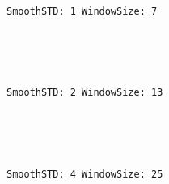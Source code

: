 \documentclass[11pt]{article}
\begin{document}
    \begin{center}
    \end{center}
    { \hspace*{\fill} \\}
    
    \begin{Verbatim}[commandchars=\\\{\}]
SmoothSTD: 1 WindowSize: 7
    \end{Verbatim}

    \begin{center}
    \end{center}
    { \hspace*{\fill} \\}
    
    \begin{center}
    \end{center}
    { \hspace*{\fill} \\}
    
    \begin{Verbatim}[commandchars=\\\{\}]
SmoothSTD: 2 WindowSize: 13
    \end{Verbatim}

    \begin{center}
    \end{center}
    { \hspace*{\fill} \\}
    
    \begin{center}
    \end{center}
    { \hspace*{\fill} \\}
    
    \begin{Verbatim}[commandchars=\\\{\}]
SmoothSTD: 4 WindowSize: 25
    \end{Verbatim}

    \begin{center}
    \end{center}
    { \hspace*{\fill} \\}
    
\end{document}
